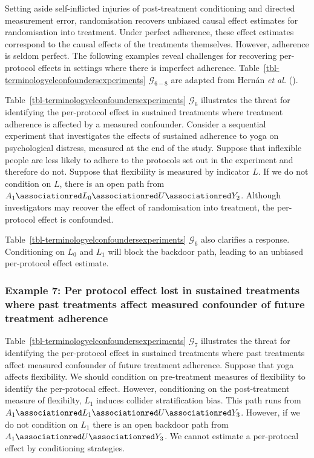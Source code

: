\documentclass[
  single column]{article}
\begin{document}
Setting aside self-inflicted injuries of post-treatment conditioning and
directed measurement error, randomisation recovers unbiased causal
effect estimates for randomisation into treatment. Under perfect
adherence, these effect estimates correspond to the causal effects of
the treatments themselves. However, adherence is seldom perfect. The
following examples reveal challenges for recovering per-protocol effects
in settings where there is imperfect adherence.
Table~\ref{tbl-terminologyelconfoundersexperiments}
\(\mathcal{G}_{6-8}\) are adapted from Hernán \emph{et al.}
().

Table~\ref{tbl-terminologyelconfoundersexperiments} \(\mathcal{G}_{6}\)
illustrates the threat for identifying the per-protocol effect in
sustained treatments where treatment adherence is affected by a measured
confounder. Consider a sequential experiment that investigates the
effects of sustained adherence to yoga on psychological distress,
measured at the end of the study. Suppose that inflexible people are
less likely to adhere to the protocols set out in the experiment and
therefore do not. Suppose that flexibility is measured by indicator
\(L\). If we do not condition on \(L\), there is an open path from
\(A_1 \associationred L_0 \associationred U \associationred Y_2\).
Although investigators may recover the effect of randomisation into
treatment, the per-protocol effect is confounded.

Table~\ref{tbl-terminologyelconfoundersexperiments} \(\mathcal{G}_{6}\)
also clarifies a response. Conditioning on \(L_0\) and \(L_1\) will
block the backdoor path, leading to an unbiased per-protocol effect
estimate.

\subsubsection{Example 7: Per protocol effect lost in sustained
treatments where past treatments affect measured confounder of future
treatment
adherence}\label{example-7-per-protocol-effect-lost-in-sustained-treatments-where-past-treatments-affect-measured-confounder-of-future-treatment-adherence}

Table~\ref{tbl-terminologyelconfoundersexperiments} \(\mathcal{G}_{7}\)
illustrates the threat for identifying the per-protocol effect in
sustained treatments where past treatments affect measured confounder of
future treatment adherence. Suppose that yoga affects flexibility. We
should condition on pre-treatment measures of flexibility to identify
the per-protocal effect. However, conditioning on the post-treatment
measure of flexibilty, \(\boxed{L_1}\) induces collider stratification
bias. This path runs from
\(A_1 \associationred L_1 \associationred U \associationred Y_3\).
However, if we do not condition on \(L_1\) there is an open backdoor
path from \(A_1 \associationred U \associationred Y_3\). We cannot
estimate a per-protocal effect by conditioning strategies.
\end{document}

